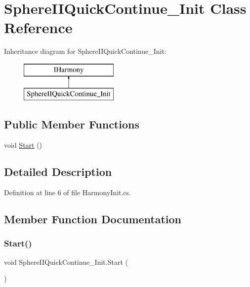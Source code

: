 \hypertarget{class_sphere_i_i_quick_continue___init}{}\section{Sphere\+I\+I\+Quick\+Continue\+\_\+\+Init Class Reference}
\label{class_sphere_i_i_quick_continue___init}
Inheritance diagram for Sphere\+I\+I\+Quick\+Continue\+\_\+\+Init\+:\begin{figure}[H]
\begin{center}
\leavevmode
\includegraphics[height=2.000000cm]{class_sphere_i_i_quick_continue___init}
\end{center}
\end{figure}
\subsection*{Public Member Functions}
\begin{DoxyCompactItemize}
\item 
void \mbox{\hyperlink{class_sphere_i_i_quick_continue___init_a1d936d4106c65213883483dceb165fbb}{Start}} ()
\end{DoxyCompactItemize}


\subsection{Detailed Description}


Definition at line 6 of file Harmony\+Init.\+cs.



\subsection{Member Function Documentation}
\mbox{\label{class_sphere_i_i_quick_continue___init_a1d936d4106c65213883483dceb165fbb}} 
\subsubsection{\texorpdfstring{Start()}{Start()}}
{\footnotesize\ttfamily void Sphere\+I\+I\+Quick\+Continue\+\_\+\+Init.\+Start (\begin{DoxyParamCaption}{ }\end{DoxyParamCaption})}



